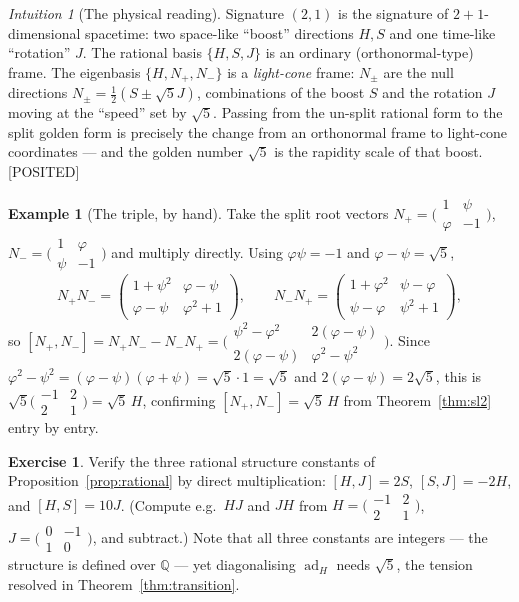 \documentclass[11pt]{article}
\theoremstyle{plain}
\theoremstyle{definition}
\newtheorem{example}[theorem]{Example}
\newtheorem{exercise}[theorem]{Exercise}
\theoremstyle{remark}
\newtheorem{intuition}[theorem]{Intuition}
\newcommand{\Posited}{\textcolor{positedc}{[POSITED]}}
\newcommand{\ad}{\operatorname{ad}}
\begin{document}
\begin{intuition}[The physical reading]
Signature $(2,1)$ is the signature of $2{+}1$-dimensional spacetime: two space-like ``boost'' directions $H,S$ and one time-like ``rotation'' $J$. The rational basis $\{H,S,J\}$ is an ordinary (orthonormal-type) frame. The eigenbasis $\{H,N_+,N_-\}$ is a \emph{light-cone} frame: $N_\pm$ are the null directions $N_\pm=\tfrac12(S\pm\sqrt5 J)$, combinations of the boost $S$ and the rotation $J$ moving at the ``speed'' set by $\sqrt5$. Passing from the un-split rational form to the split golden form is precisely the change from an orthonormal frame to light-cone coordinates --- and the golden number $\sqrt5$ is the rapidity scale of that boost. \Posited
\end{intuition}

\begin{example}[The triple, by hand]\label{ex:triple}
Take the split root vectors $N_{+}=\bigl(\begin{smallmatrix}1&ψ\\ φ&-1\end{smallmatrix}\bigr)$, $N_{-}=\bigl(\begin{smallmatrix}1&φ\\ ψ&-1\end{smallmatrix}\bigr)$ and multiply directly. Using $φψ=-1$ and $φ-ψ=\sqrt5$,
\[
N_{+}N_{-}=\begin{pmatrix}1+ψ^{2}&φ-ψ\\ φ-ψ&φ^{2}+1\end{pmatrix},\qquad
N_{-}N_{+}=\begin{pmatrix}1+φ^{2}&ψ-φ\\ ψ-φ&ψ^{2}+1\end{pmatrix},
\]
so $[N_{+},N_{-}]=N_{+}N_{-}-N_{-}N_{+}=\bigl(\begin{smallmatrix}ψ^{2}-φ^{2}&2(φ-ψ)\\ 2(φ-ψ)&φ^{2}-ψ^{2}\end{smallmatrix}\bigr)$. Since $φ^{2}-ψ^{2}=(φ-ψ)(φ+ψ)=\sqrt5\cdot1=\sqrt5$ and $2(φ-ψ)=2\sqrt5$, this is $\sqrt5\bigl(\begin{smallmatrix}-1&2\\2&1\end{smallmatrix}\bigr)=\sqrt5\,H$, confirming $[N_{+},N_{-}]=\sqrt5\,H$ from Theorem~\ref{thm:sl2} entry by entry.
\end{example}

\begin{exercise}\label{exr:structure}
Verify the three rational structure constants of Proposition~\ref{prop:rational} by direct multiplication: $[H,J]=2S$, $[S,J]=-2H$, and $[H,S]=10J$. (Compute e.g.\ $HJ$ and $JH$ from $H=\bigl(\begin{smallmatrix}-1&2\\2&1\end{smallmatrix}\bigr)$, $J=\bigl(\begin{smallmatrix}0&-1\\1&0\end{smallmatrix}\bigr)$, and subtract.) Note that all three constants are integers --- the structure is defined over $ℚ$ --- yet diagonalising $\ad_H$ needs $\sqrt5$, the tension resolved in Theorem~\ref{thm:transition}.
\end{exercise}
\end{document}
